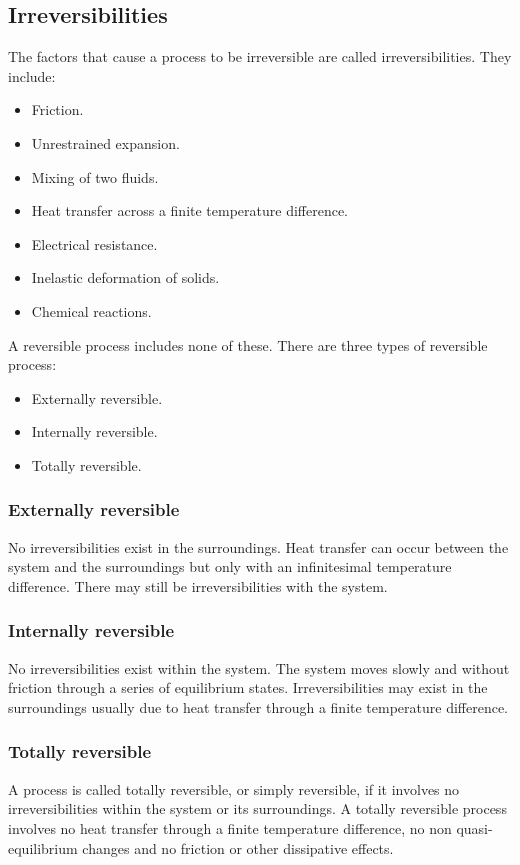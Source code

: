 \documentclass[class=report, crop=false, 12pt,a4paper]{standalone}
\begin{document}
\subsection{Irreversibilities}
The factors that cause a process to be irreversible are called irreversibilities. 
They include:
\begin{itemize}[noitemsep]
  \item Friction.
  \item Unrestrained expansion.
  \item Mixing of two fluids.
  \item Heat transfer across a finite temperature difference.
  \item Electrical resistance.
  \item Inelastic deformation of solids.
  \item Chemical reactions.
\end{itemize}
A reversible process includes none of these. There are three types of reversible process:
\begin{itemize}[noitemsep]
  \item Externally reversible.
  \item Internally reversible.
  \item Totally reversible.
\end{itemize}
\subsubsection{Externally reversible}
No irreversibilities exist in the surroundings. Heat transfer can occur between the system and the surroundings but only with an infinitesimal temperature difference. There may still be irreversibilities with the system.
\subsubsection{Internally reversible}
No irreversibilities exist within the system. The system moves slowly and without friction through a series of equilibrium states. Irreversibilities may exist in the surroundings usually due to heat transfer through a finite temperature difference.
\subsubsection{Totally reversible}
A process is called totally reversible, or simply reversible, if it involves no irreversibilities within the system or its surroundings. A totally reversible process involves no heat transfer through a finite temperature difference, no non quasi-equilibrium changes and no friction or other dissipative effects.
\end{document}
